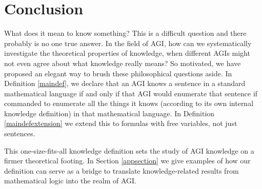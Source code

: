 \documentclass[runningheads]{llncs}
\begin{document}
\section{Conclusion}
\label{conclusionsection}

What does it mean to know something? This is a difficult question and there probably
is no one true answer. In the field of AGI, how can we systematically investigate
the theoretical properties of knowledge, when different AGIs might not even agree
about what knowledge really means? So motivated, we have proposed
an elegant way to brush these philosophical questions aside. In Definition \ref{maindef},
we declare that an AGI knows a sentence in a standard mathematical language if and
only if that AGI would enumerate that sentence if commanded to enumerate all the
things it knows (according to its own internal knowledge definition) in that
mathematical language. In Definition \ref{maindefextension}
we extend this to formulas with free variables, not just sentences.

This one-size-fits-all knowledge definition sets the study of AGI knowledge
on a firmer theoretical footing. In Section \ref{appsection} we give examples
of how our definition can serve as a bridge to translate knowledge-related
results from mathematical logic into the realm of AGI.



\end{document}
